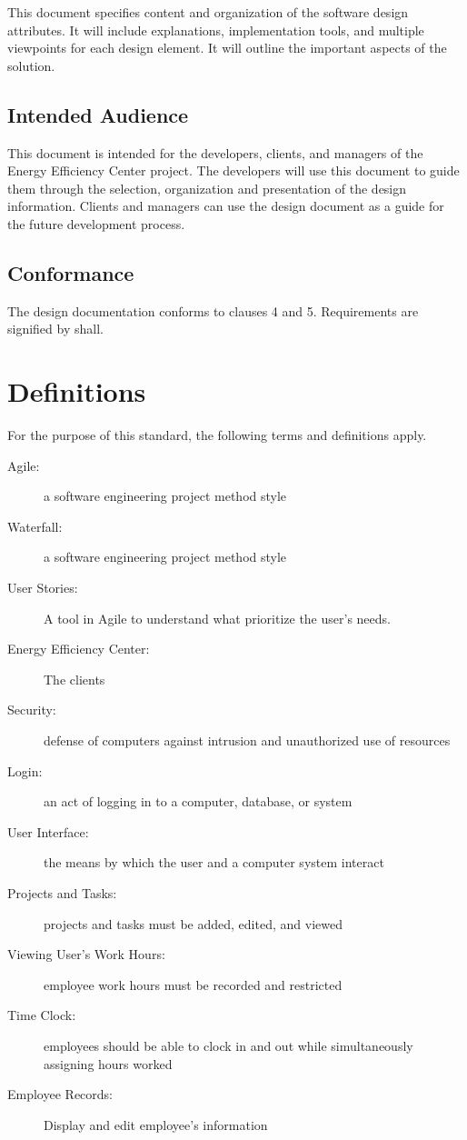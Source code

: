 \documentclass[letterpaper,10pt,titlepage,journal,compsoc,draftclsnofoot,onecolumn]{IEEEtran}
\begin{document}
This document specifies content and organization of  the software design attributes. It will include explanations, implementation tools, and multiple viewpoints for each design element. It will outline the important aspects of the solution. 

\subsection{Intended Audience}

This document is intended for the developers,  clients, and managers of the Energy Efficiency Center project. The developers will use this document to guide them through the selection, organization and presentation of the design information. Clients and managers can use the design document as a guide for the future development process.

\subsection{Conformance}

The design documentation conforms to clauses 4 and 5. Requirements are signified by shall. 

\section{Definitions}

For the purpose of this standard, the following terms and definitions apply.

\begin{description}
\item[Agile: ] a software engineering project method style
\item[Waterfall: ] a software engineering project method style
\item[User Stories: ] A tool in Agile to understand what prioritize the user’s needs.
\item[Energy Efficiency Center: ] The clients
\item[Security:] defense of computers against intrusion and unauthorized use of resources
\item[Login:] an act of logging in to a computer, database, or system
\item[User Interface:] the means by which the user and a computer system interact
\item[Projects and Tasks:] projects and tasks must be added, edited, and viewed
\item[Viewing User’s Work Hours:] employee work hours must be recorded and restricted 
\item[Time Clock: ] employees should be able to clock in and out while simultaneously assigning hours worked
\item[Employee Records:] Display and edit employee’s information
\end{description}
\end{document}
